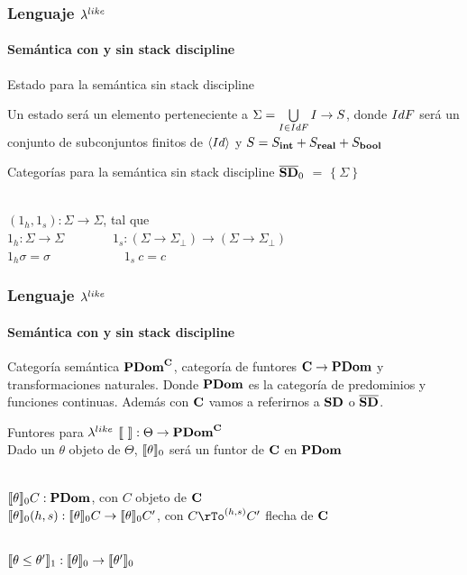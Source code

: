 \documentclass{beamer}
\begin{document}
\begin{frame}
\frametitle{Lenguaje $\lambda^{like}$}
\framesubtitle{Semántica con y sin stack discipline}

\begin{block}{Estado para la semántica sin stack discipline}

Un estado ser\'a un elemento perteneciente a 
$\Sigma = \bigcup\limits_{I \in IdF} I \rightarrow S$, 
donde $IdF$ ser\'a un conjunto de subconjuntos finitos de $\langle Id \rangle$ y
$S = S_{\textbf{int}} + S_{\textbf{real}} + S_{\textbf{bool}}$\\

\end{block}

\pause

\begin{block}{Categorías para la semántica sin stack discipline}
$\overline{\textbf{SD}}_0$ $=$ $\{\ \Sigma \ \}$\\

\

$(1_h,1_s) : \Sigma \rightarrow \Sigma$, tal que\\

$1_h : \Sigma \rightarrow \Sigma$ \ \ \ \ \ \ \
$1_s: (\Sigma \rightarrow \Sigma_{\bot}) \rightarrow (\Sigma \rightarrow \Sigma_{\bot})$\\
\indent
$1_h \sigma = \sigma$ \ \ \ \ \ \ \ \ \ \ \ $1_s \ c = c$

\end{block}

\end{frame}

\begin{frame}
\frametitle{Lenguaje $\lambda^{like}$}
\framesubtitle{Semántica con y sin stack discipline}

\begin{block}{Categoría semántica}
$\textbf{PDom}^{\textbf{C}}$, categoría de funtores $\textbf{C} \rightarrow \textbf{PDom}$ y transformaciones naturales.
Donde $\textbf{PDom}$ es la categoría de predominios y funciones continuas. Además con $\textbf{C}$ vamos a
referirnos a $\textbf{SD}$ o $\overline{\textbf{SD}}$.
\end{block}

\pause

\begin{block}{Funtores para $\lambda^{like}$}
$\llbracket  \  \rrbracket : \Theta \rightarrow \textbf{PDom}^{\textbf{C}}$\\
\pause
Dado un $\theta$ objeto de $\Theta$, $\llbracket \theta \rrbracket_{0}$ será un funtor 
de $\textbf{C}$ en $\textbf{PDom}$\\
\

\pause
$\llbracket \theta \rrbracket_{0}C : \textbf{PDom}$, con $C$ objeto de $\textbf{C}$\\
\pause
$\llbracket \theta \rrbracket_{0}(h,s) : \llbracket \theta \rrbracket_{0}C \rightarrow \llbracket \theta \rrbracket_{0}C'$, con 
$C \rTo^{(h,s)} C'$ flecha de $\textbf{C}$\\

\

\pause
$\llbracket \theta \leq \theta' \rrbracket_{1} : 
	\llbracket \theta \rrbracket_{0} \rightarrow \llbracket \theta' \rrbracket_{0}$\\

\end{block}

\end{frame}
\end{document}

